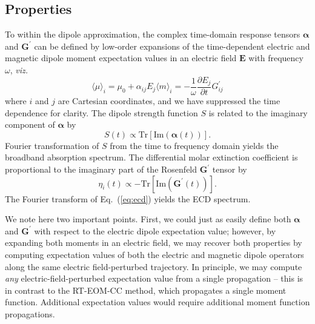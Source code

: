 \subsection{Properties} \label{ss:prop}
To within the dipole approximation, 
the complex time-domain response tensors 
$\boldsymbol{\alpha}$ and 
$\textbf{G}^\prime$ can be defined by low-order expansions 
of the time-dependent electric and magnetic dipole moment expectation values 
in an electric field $\textbf{E}$ with frequency $\omega$, \textit{viz.}
\begin{subequations} \label{eq:exps}
    \begin{equation} \label{eq:mu_exp}
        \langle\mu\rangle_i = \mu_0 + \alpha_{ij}E_j
    \end{equation}
    \begin{equation} \label{eq:m_exp}
        \langle m\rangle_i = -\frac{1}{\omega}\frac{\partial E_j}{\partial t}G^\prime_{ij}
    \end{equation}
\end{subequations}
where $i$ and $j$ are Cartesian coordinates, and we have suppressed 
the time dependence for clarity.  
The dipole strength function $S$
is related to the 
imaginary component of $\boldsymbol{\alpha}$ by
\begin{equation} \label{eq:abs}
    S(t) \propto \textrm{Tr}\left[ \textrm{Im}\left( \boldsymbol{\alpha}(t) \right) \right]. 
\end{equation}
Fourier transformation of $S$ from the time to frequency domain
yields the broadband absorption spectrum. 
The differential molar extinction coefficient is proportional to the imaginary part
of the Rosenfeld $\textbf{G}^\prime$ tensor\cite{Rosenfeld1929} by
\begin{equation} \label{eq:ecd}
    \eta_i(t) \propto -\textrm{Tr}[\textrm{Im}(\textbf{G}^\prime(t))].
\end{equation}
The Fourier transform of Eq.~(\ref{eq:ecd}) yields the ECD spectrum.

We note here two important points. First, we could just as easily
define both $\boldsymbol{\alpha}$ and $\textbf{G}^\prime$ with respect
to the electric dipole expectation value; however, by expanding both
moments in an electric field, we may recover both properties by computing
expectation values of both the electric and magnetic dipole operators
along the same electric field-perturbed trajectory. In principle, we may
compute \textit{any} electric-field-perturbed expectation value from a
single propagation -- this is in contrast to the RT-EOM-CC method, which
propagates a single moment function. Additional expectation values
would require additional moment function propagations.

